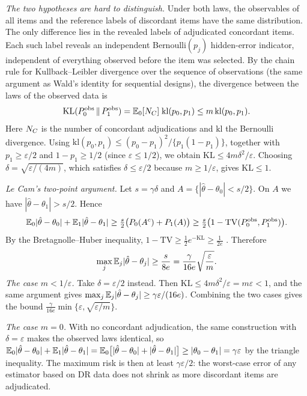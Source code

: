 \emph{The two hypotheses are hard to distinguish.} Under both laws, the observables of all items and the reference labels of discordant items have the same distribution. The only difference lies in the revealed labels of adjudicated concordant items. Each such label reveals an independent Bernoulli$(p_j)$ hidden-error indicator, independent of everything observed before the item was selected. By the chain rule for Kullback--Leibler divergence over the sequence of observations (the same argument as Wald's identity for sequential designs), the divergence between the laws of the observed data is
\[
\mathrm{KL}(P_0^{\rm obs}\,\|\,P_1^{\rm obs})=\mathbb{E}_0[N_C]\;\mathrm{kl}(p_0,p_1)\le m\,\mathrm{kl}(p_0,p_1).
\]
Here $N_C$ is the number of concordant adjudications and $\mathrm{kl}$ the Bernoulli divergence. Using $\mathrm{kl}(p_0,p_1)\le(p_0-p_1)^2/\{p_1(1-p_1)\}$, together with $p_1\ge\varepsilon/2$ and $1-p_1\ge1/2$ (since $\varepsilon\le1/2$), we obtain $\mathrm{KL}\le4m\delta^2/\varepsilon$. Choosing $\delta=\sqrt{\varepsilon/(4m)}$, which satisfies $\delta\le\varepsilon/2$ because $m\ge1/\varepsilon$, gives $\mathrm{KL}\le1$.

\emph{Le Cam's two-point argument.} Let $s=\gamma\delta$ and $A=\{|\hat\theta-\theta_0|<s/2\}$. On $A$ we have $|\hat\theta-\theta_1|>s/2$. Hence
\[
\mathbb{E}_0|\hat\theta-\theta_0|+\mathbb{E}_1|\hat\theta-\theta_1|\ge\tfrac s2\big(P_0(A^c)+P_1(A)\big)\ge\tfrac s2\big(1-\mathrm{TV}(P_0^{\rm obs},P_1^{\rm obs})\big).
\]
By the Bretagnolle--Huber inequality, $1-\mathrm{TV}\ge\frac12e^{-\mathrm{KL}}\ge\frac1{2e}$ \citep{tsybakov2009introduction}. Therefore
\[
\max_j\mathbb{E}_j|\hat\theta-\theta_j|\ge\frac{s}{8e}=\frac{\gamma}{16e}\sqrt{\frac{\varepsilon}{m}} .
\]
\emph{The case $m<1/\varepsilon$.} Take $\delta=\varepsilon/2$ instead. Then $\mathrm{KL}\le4m\delta^2/\varepsilon=m\varepsilon<1$, and the same argument gives $\max_j\mathbb{E}_j|\hat\theta-\theta_j|\ge\gamma\varepsilon/(16e)$. Combining the two cases gives the bound $\frac{\gamma}{16e}\min\{\varepsilon,\sqrt{\varepsilon/m}\}$.

\emph{The case $m=0$.} With no concordant adjudication, the same construction with $\delta=\varepsilon$ makes the observed laws identical, so $\mathbb{E}_0|\hat\theta-\theta_0|+\mathbb{E}_1|\hat\theta-\theta_1|=\mathbb{E}_0\big[|\hat\theta-\theta_0|+|\hat\theta-\theta_1|\big]\ge|\theta_0-\theta_1|=\gamma\varepsilon$ by the triangle inequality. The maximum risk is then at least $\gamma\varepsilon/2$: the worst-case error of any estimator based on DR data does not shrink as more discordant items are adjudicated. \hfill\BlackBox

